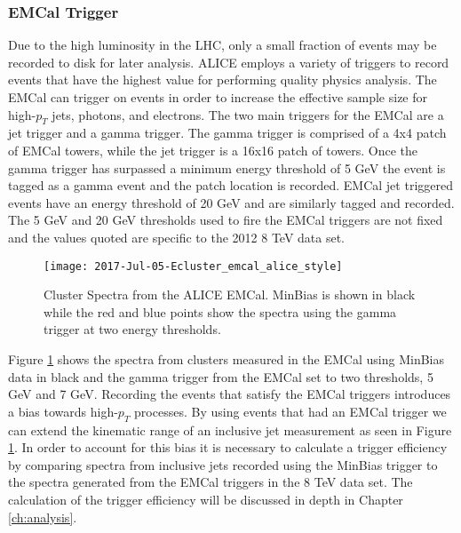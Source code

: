 \subsubsection{EMCal Trigger}


Due to the high luminosity in the LHC, only a small fraction of events may be recorded to disk for later analysis.  ALICE employs a variety of triggers to record events that have the highest value for performing quality physics analysis.  The EMCal can trigger on events in order to increase the effective sample size for high-$p_{T}$ jets, photons, and electrons.  The two main triggers\cite{bourrion2010level}\cite{bourrion2013alice} for the EMCal are a jet trigger and a gamma trigger.  The gamma trigger is comprised of a 4x4 patch of EMCal towers, while the jet trigger is a 16x16 patch of towers.  Once the gamma trigger has surpassed a minimum energy threshold of 5 GeV\cite{Kral2012261} the event is tagged as a gamma event and the patch location is recorded.  EMCal jet triggered events have an energy threshold of 20 GeV and are similarly tagged and recorded.  The 5 GeV and 20 GeV thresholds used to fire the EMCal triggers are not fixed and the values quoted are specific to the 2012 8 TeV data set. 

\begin{figure}[h]
\texttt{[image: 2017-Jul-05-Ecluster\_emcal\_alice\_style]}
\centering
\caption{Cluster Spectra from the ALICE EMCal.  MinBias is shown in black while the red and blue points show the spectra using the gamma trigger at two energy thresholds\cite{Jahnke:2018mrq}.}
\label{fig:EMCalSpectra}
\end{figure}

Figure \ref{fig:EMCalSpectra} shows the spectra from clusters measured in the EMCal using MinBias data in black and the gamma trigger from the EMCal set to two thresholds, 5 GeV and 7 GeV.  Recording the events that satisfy the EMCal triggers introduces a bias towards high-$p_{T}$ processes.  By using events that had an EMCal trigger we can extend the kinematic range of an inclusive jet measurement as seen in Figure \ref{fig:EMCalSpectra}.  In order to account for this bias it is necessary to calculate a trigger efficiency by comparing spectra from inclusive jets recorded using the MinBias trigger to the spectra generated from the EMCal triggers in the 8 TeV data set.  The calculation of the trigger efficiency will be discussed in depth in Chapter \ref{ch:analysis}.